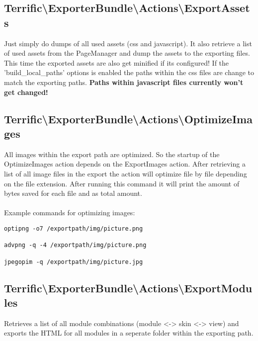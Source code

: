 \noindent \begin{minipage}{\textwidth}
\vspace{1.5em}
\hypertarget{sec-Actions-ExportAssets}{\subsection{Terrific\textnormal{\textbackslash}ExporterBundle\textnormal{\textbackslash}Actions\textnormal{\textbackslash}ExportAssets}}
Just simply do dumps of all used assets (css and javascript). It also retrieve a list of used assets from the PageManager and dump the assets to the exporting files. This time the exported assets are also get minified if its configured! If the 'build\_local\_paths' options is enabled the paths within the css files are change to match the exporting paths. \textbf{Paths within javascript files currently won't get changed!}
\end{minipage}

\noindent \begin{minipage}{\textwidth}
\vspace{1.5em}
\hypertarget{sec-Actions-OptimizeImages}{\subsection{Terrific\textnormal{\textbackslash}ExporterBundle\textnormal{\textbackslash}Actions\textnormal{\textbackslash}OptimizeImages}}
All images within the export path are optimized. So the startup of the OptimizeImages action depends on the ExportImages action. After retrieving a list of all image files in the export the action will optimize file by file depending on the file extension. After running this command it will print the amount of bytes saved for each file and as total amount.\\
\\
Example commands for optimizing images:
\begin{verbatim}
optipng -o7 /exportpath/img/picture.png

advpng -q -4 /exportpath/img/picture.png

jpegopim -q /exportpath/img/picture.jpg
\end{verbatim}
\end{minipage}

\noindent \begin{minipage}{\textwidth}
\vspace{1.5em}
\hypertarget{sec-Actions-ExportModules}{\subsection{Terrific\textnormal{\textbackslash}ExporterBundle\textnormal{\textbackslash}Actions\textnormal{\textbackslash}ExportModules}}
Retrieves a list of all module combinations (module <-> skin <-> view) and exports the HTML for all modules in a seperate folder within the exporting path.
\end{minipage}

